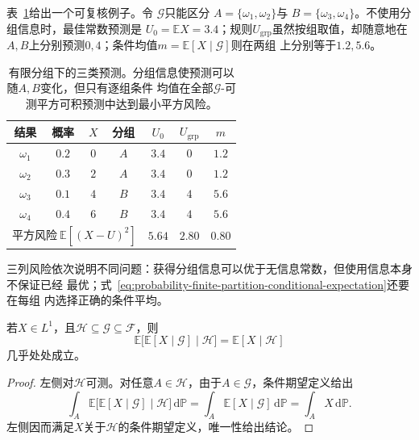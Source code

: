 表~\ref{tab:probability-finite-partition-predictions}给出一个可复核例子。令
\(\mathcal{G}\)只能区分
\(A=\{\omega_1,\omega_2\}\)与
\(B=\{\omega_3,\omega_4\}\)。不使用分组信息时，最佳常数预测是
\(U_0=\mathbb{E}X=3.4\)；规则\(U_{\mathrm{grp}}\)虽然按组取值，却随意地在
\(A,B\)上分别预测\(0,4\)；条件均值\(m=\mathbb{E}[X\mid\mathcal{G}]\)则在两组
上分别等于\(1.2,5.6\)。
\begin{table}[htbp]
  \centering
  \small
  \begin{tabular}{ccccccc}
    \toprule
    结果 & 概率 & \(X\) & 分组 & \(U_0\) & \(U_{\mathrm{grp}}\) & \(m\) \\
    \midrule
    \(\omega_1\) & \(0.2\) & \(0\) & \(A\) & \(3.4\) & \(0\) & \(1.2\) \\
    \(\omega_2\) & \(0.3\) & \(2\) & \(A\) & \(3.4\) & \(0\) & \(1.2\) \\
    \(\omega_3\) & \(0.1\) & \(4\) & \(B\) & \(3.4\) & \(4\) & \(5.6\) \\
    \(\omega_4\) & \(0.4\) & \(6\) & \(B\) & \(3.4\) & \(4\) & \(5.6\) \\
    \midrule
    \multicolumn{4}{r}{平方风险\(\ \mathbb{E}[(X-U)^2]\)} &
    \(5.64\) & \(2.80\) & \(0.80\) \\
    \bottomrule
  \end{tabular}
  \caption{有限分组下的三类预测。分组信息使预测可以随\(A,B\)变化，但只有逐组条件
  均值在全部\(\mathcal{G}\)-可测平方可积预测中达到最小平方风险。}
  \label{tab:probability-finite-partition-predictions}
\end{table}
三列风险依次说明不同问题：获得分组信息可以优于无信息常数，但使用信息本身不保证已经
最优；式~\eqref{eq:probability-finite-partition-conditional-expectation}还要在每组
内选择正确的条件平均。
\begin{theorem}[塔式性质]
\label{thm:probability-tower-property}
若\(X\in L^1\)，且\(\mathcal{H}\subseteq\mathcal{G}\subseteq\mathcal{F}\)，则
\[ \mathbb{E}\bigl[\mathbb{E}[X\mid\mathcal{G}]
  \mid\mathcal{H}\bigr]=\mathbb{E}[X\mid\mathcal{H}] \]
几乎处处成立。
\end{theorem}

\begin{proof}
左侧对\(\mathcal{H}\)可测。对任意\(A\in\mathcal{H}\)，由于\(A\in\mathcal{G}\)，条件期望定义给出
\[
  \int_A
  \mathbb{E}\bigl[\mathbb{E}[X\mid\mathcal{G}]
  \mid\mathcal{H}\bigr]\,\mathrm{d}\mathbb{P}
  =
  \int_A\mathbb{E}[X\mid\mathcal{G}]\,\mathrm{d}\mathbb{P}
  =
  \int_A X\,\mathrm{d}\mathbb{P}.
\]
左侧因而满足\(X\)关于\(\mathcal{H}\)的条件期望定义，唯一性给出结论。
\end{proof}

